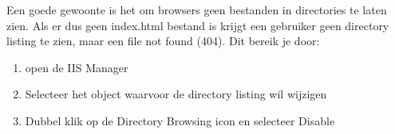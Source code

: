 Een goede gewoonte is het om browsers geen bestanden in directories te laten zien. Als er dus geen index.html bestand is krijgt een gebruiker geen directory listing te zien, maar een file not found (404). Dit bereik je door:
\begin{enumerate}
\item open de IIS Manager
\item Selecteer het object waarvoor de directory listing wil wijzigen
\item Dubbel klik op de Directory Browsing icon en selecteer Disable
\end{enumerate}
